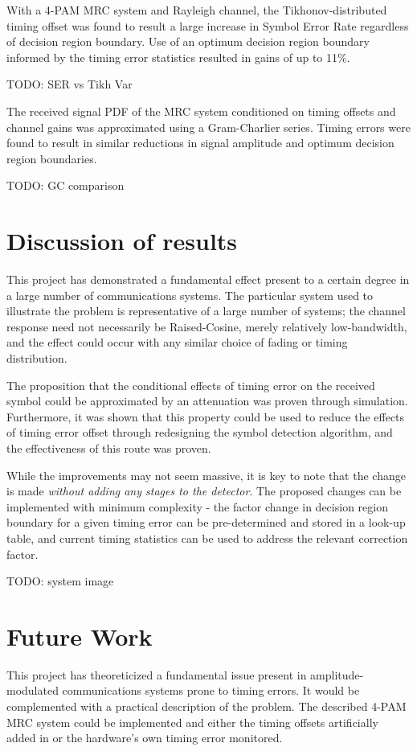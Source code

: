 With a 4-PAM MRC system and Rayleigh channel, the Tikhonov-distributed timing offset was found to result a large increase in Symbol Error Rate regardless of decision region boundary. Use of an optimum decision region boundary informed by the timing error statistics resulted in gains of up to 11\%.

TODO: SER vs Tikh Var

The received signal PDF of the MRC system conditioned on timing offsets and channel gains was approximated using a Gram-Charlier series. Timing errors were found to result in similar reductions in signal amplitude and optimum decision region boundaries.

TODO: GC comparison

\chapter{Discussion of results}

This project has demonstrated a fundamental effect present to a certain degree in a large number of communications systems. The particular system used to illustrate the problem is representative of a large number of systems; the channel response need not necessarily be Raised-Cosine, merely relatively low-bandwidth, and the effect could occur with any similar choice of fading or timing distribution.

The proposition that the conditional effects of timing error on the received symbol could be approximated by an attenuation was proven through simulation. Furthermore, it was shown that this property could be used to reduce the effects of timing error offset through redesigning the symbol detection algorithm, and the effectiveness of this route was proven.

While the improvements may not seem massive, it is key to note that the change is made \emph{without adding any stages to the detector}. The proposed changes can be implemented with minimum complexity - the factor change in decision region boundary for a given timing error can be pre-determined and stored in a look-up table,  and current timing statistics can be used to address the relevant correction factor.

TODO: system image

\chapter{Future Work}

This project has theoreticized a fundamental issue present in amplitude-modulated communications systems prone to timing errors. It would be complemented with a practical description of the problem. The described 4-PAM MRC system could be implemented and either the timing offsets artificially added in or the hardware's own timing error monitored.


